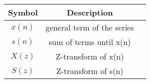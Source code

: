 \begin{tabular}{|c|c|c|}
    \hline
    	\textbf{Symbol} & \textbf{Description} \\
    \hline
	  $x(n)$ & general term of the series \\
    \hline
    	  $s(n)$ & sum of terms until x(n) \\
    \hline
	  $X(z)$ & Z-transform of x(n)\\
    \hline
	  $S(z)$ & Z-transform of s(n)\\
    \hline
\end{tabular}
